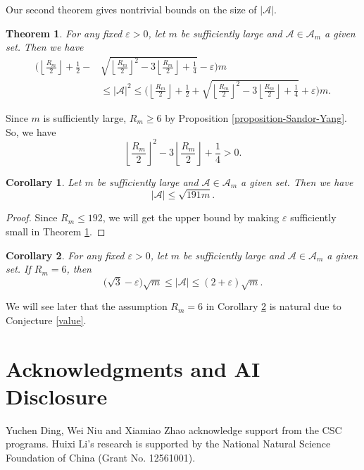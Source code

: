 \documentclass[12pt,a4paper,reqno]{amsart}
\numberwithin{equation}{section}
\newcommand{\floor}[1]{\left\lfloor #1\right\rfloor}
\theoremstyle{plain}
\newtheorem{theorem}{Theorem}
\newtheorem{corollary}{Corollary}
\theoremstyle{definition}
\begin{document}
Our second theorem gives nontrivial bounds on the size of $|\mathcal{A}|$. 

\begin{theorem}\label{thm:2}
For any fixed $\varepsilon>0$, let $m$ be sufficiently large and $\mathcal{A}\in \mathscr{A}_m$ a given set. Then we have
    \begin{align*}
        \Bigg(\floor{\frac{R_m}{2}}+\frac{1}{2}-&\sqrt{\floor{\frac{R_m}{2}}^2-3\floor{\frac{R_m}{2}}+\frac{1}{4}}-\varepsilon\Bigg) m \\
        &\le  |\mathcal{A}|^2 \le \Bigg(\floor{\frac{R_m}{2}}+\frac{1}{2}+\sqrt{\floor{\frac{R_m}{2}}^2-3\floor{\frac{R_m}{2}}+\frac{1}{4}}+\varepsilon\Bigg) m.
    \end{align*}

\end{theorem}


Since $m$ is sufficiently large, $R_m\ge 6$ by Proposition \ref{proposition-Sandor-Yang}. So, we have
$$
\floor{\frac{R_m}{2}}^2-3\floor{\frac{R_m}{2}}+\frac{1}{4}>0.
$$

\begin{corollary}\label{corollary-new}
Let $m$ be sufficiently large and $\mathcal{A}\in \mathscr{A}_m$ a given set. Then we have
$$
|\mathcal{A}|\le \sqrt{191m}.
$$
\end{corollary}
\begin{proof}
Since $R_m\le 192$, we will get the upper bound by making $\varepsilon$ sufficiently small in Theorem \ref{thm:2}.
\end{proof}


\begin{corollary}\label{corollary-1}
For any fixed $\varepsilon>0$, let $m$ be sufficiently large and $\mathcal{A}\in \mathscr{A}_m$ a given set. If $R_m=6$, then  
  $$
\big(\sqrt{3}-\varepsilon\big)\sqrt{m}\le |\mathcal{A}|\le (2+\varepsilon)\sqrt{m}. 
$$  
\end{corollary}
We will see later that the assumption $R_m=6$ in Corollary \ref{corollary-1} is natural due
 to Conjecture \ref{value}.

\section*{Acknowledgments and AI Disclosure}

Yuchen Ding, Wei Niu and Xiamiao Zhao acknowledge support from the CSC programs.
Huixi Li's research is supported by the National Natural Science Foundation of China (Grant No. 12561001). 
\end{document}
